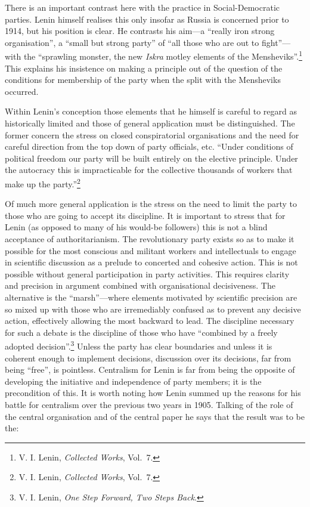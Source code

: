 There is an important contrast here with the practice in Social-Democratic parties. Lenin himself realises this only insofar as Russia is concerned prior to 1914, but his position is clear. He contrasts his aim---a ``really iron strong organisation'', a ``small but strong party'' of ``all those who are out to fight''---with the ``sprawling monster, the new \emph{Iskra} motley elements of the Mensheviks''.\footnote{V. I. Lenin, \emph{Collected Works}, Vol.~7.} This explains his insistence on making a principle out of the question of the conditions for membership of the party when the split with the Mensheviks occurred.

Within Lenin's conception those elements that he himself is careful to regard as historically limited and those of general application must be distinguished. The former concern the stress on closed conspiratorial organisations and the need for careful direction from the top down of party officials, etc. ``Under conditions of political freedom our party will be built entirely on the elective principle. Under the autocracy this is impracticable for the collective thousands of workers that make up the party.''\footnote{V. I. Lenin, \emph{Collected Works}, Vol.~7.}

Of much more general application is the stress on the need to limit the party to those who are going to accept its discipline. It is important to stress that for Lenin (as opposed to many of his would-be followers) this is not a blind acceptance of authoritarianism. The revolutionary party exists so as to make it possible for the most conscious and militant workers and intellectuals to engage in scientific discussion as a prelude to concerted and cohesive action. This is not possible without general participation in party activities. This requires clarity and precision in argument combined with organisational decisiveness. The alternative is the ``marsh''---where elements motivated by scientific precision are so mixed up with those who are irremediably confused as to prevent any decisive action, effectively allowing the most backward to lead. The discipline necessary for such a debate is the discipline of those who have ``combined by a freely adopted decision''.\footnote{V. I. Lenin, \emph{One Step Forward, Two Steps Back}.} Unless the party has clear boundaries and unless it is coherent enough to implement decisions, discussion over its decisions, far from being ``free'', is pointless. Centralism for Lenin is far from being the opposite of developing the initiative and independence of party members; it is the precondition of this. It is worth noting how Lenin summed up the reasons for his battle for centralism over the previous two years in 1905. Talking of the role of the central organisation and of the central paper he says that the result was to be the:

